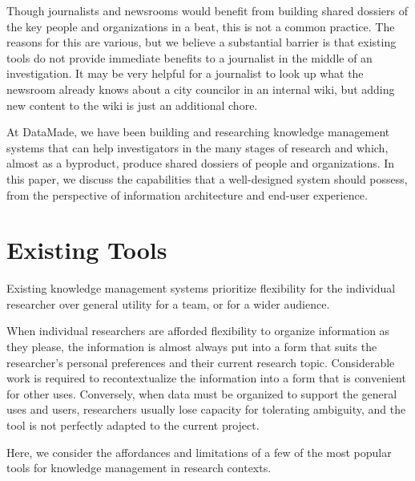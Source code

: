 \documentclass[format=siggraph, review=true]{acmart}
\begin{document}
Though journalists and newsrooms would benefit from building shared
dossiers of the key people and organizations in a beat, this is not a
common practice. The reasons for this are various, but we believe a
substantial barrier is that existing tools do not provide immediate
benefits to a journalist in the middle of an investigation. It may be
very helpful for a journalist to look up what the newsroom already
knows about a city councilor in an internal wiki, but adding new
content to the wiki is just an additional chore. 

At DataMade, we have been building and researching knowledge
management systems that can help investigators in the many stages
of research and which, almost as a byproduct, produce shared dossiers
of people and organizations. In this paper, we discuss the
capabilities that a well-designed system should possess, from the
perspective of information architecture and end-user experience.

\section{Existing Tools}
Existing knowledge management systems prioritize flexibility for the
individual researcher over general utility for a team, or for a wider
audience. 

When individual researchers are afforded flexibility to organize
information as they please, the information is almost always put into
a form that suits the researcher's personal preferences and their
current research topic. Considerable work is required to
recontextualize the information into a form that is convenient for
other uses. Conversely, when data must be organized to support the
general uses and users, researchers usually lose capacity for
tolerating ambiguity, and the tool is not perfectly adapted to the
current project.

Here, we consider the affordances and limitations of a few of the most
popular tools for knowledge management in research contexts.
\end{document}
